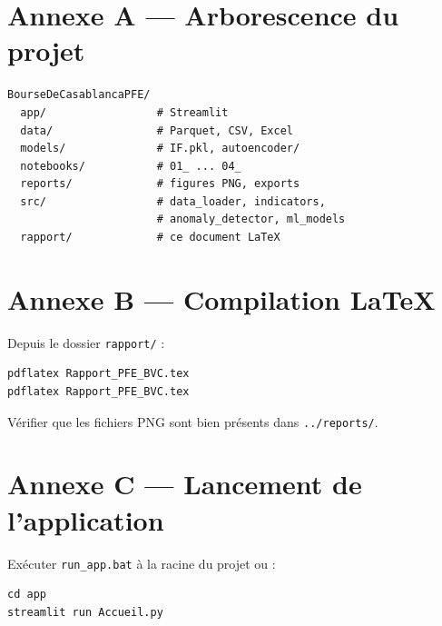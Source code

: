 \documentclass[a4paper,12pt,twoside,openright]{report}
\begin{document}
\appendix
\chapter{Annexe A --- Arborescence du projet}
\begin{lstlisting}
BourseDeCasablancaPFE/
  app/                 # Streamlit
  data/                # Parquet, CSV, Excel
  models/              # IF.pkl, autoencoder/
  notebooks/           # 01_ ... 04_
  reports/             # figures PNG, exports
  src/                 # data_loader, indicators,
                       # anomaly_detector, ml_models
  rapport/             # ce document LaTeX
\end{lstlisting}

\chapter{Annexe B --- Compilation LaTeX}
Depuis le dossier \texttt{rapport/} :
\begin{lstlisting}
pdflatex Rapport_PFE_BVC.tex
pdflatex Rapport_PFE_BVC.tex
\end{lstlisting}
Vérifier que les fichiers PNG sont bien présents dans \texttt{../reports/}.

\chapter{Annexe C --- Lancement de l'application}
Exécuter \texttt{run\_app.bat} à la racine du projet ou :
\begin{lstlisting}
cd app
streamlit run Accueil.py
\end{lstlisting}
\end{document}
